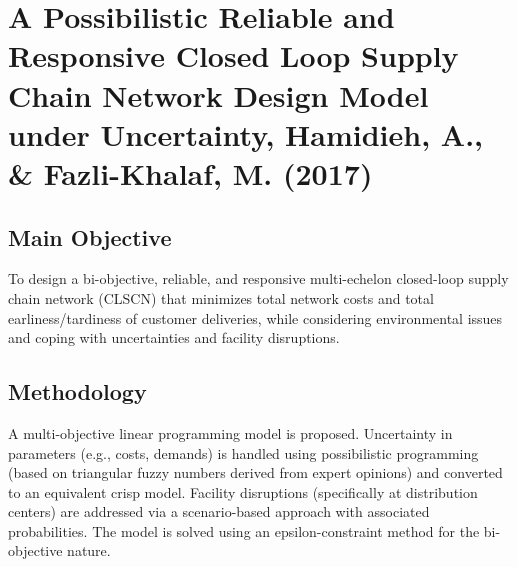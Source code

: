 \section{{A Possibilistic Reliable and Responsive Closed Loop Supply Chain Network Design Model under Uncertainty, Hamidieh, A., \& Fazli-Khalaf, M. (2017)}}

\subsection*{Main Objective}
To design a bi-objective, reliable, and responsive multi-echelon closed-loop supply chain network (CLSCN) that minimizes total network costs and total earliness/tardiness of customer deliveries, while considering environmental issues and coping with uncertainties and facility disruptions.

\subsection*{Methodology}
A multi-objective linear programming model is proposed. Uncertainty in parameters (e.g., costs, demands) is handled using possibilistic programming (based on triangular fuzzy numbers derived from expert opinions) and converted to an equivalent crisp model. Facility disruptions (specifically at distribution centers) are addressed via a scenario-based approach with associated probabilities. The model is solved using an epsilon-constraint method for the bi-objective nature.


